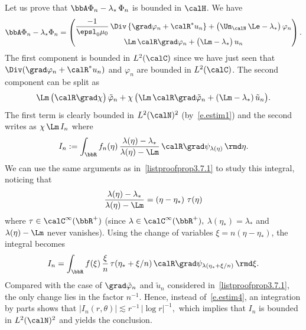 \begin{proofc}
\begin{step}\label{listproofprop3.7.3}
Let us prove that $\bbA \Phi_n - \lambda_*\,\Phi_n$ is bounded in $\calH$. We have
\[
\bbA \Phi_n - \lambda_* \Phi_n =
\begin{pmatrix}
\displaystyle \frac{-1}{\epsl_0 \mu_0}\,\Div \left\{ \grad\varphi_n + \calR^* u_n \right\} + \big(\Un_\calN\,\Le - \lambda_* \big)\,\varphi_n \\[8pt]
\Lm\,\calR\grad\varphi_n + \big(\Lm - \lambda_* \big)\,u_n
\end{pmatrix}.
\]
The first component is bounded in $L^2(\calC)$ since we have just seen that $\Div (\grad \varphi_n + \calR^* u_n) $ and $\varphi_n$ are bounded in $L^2(\calC)$. The second component can be split as
\[
\Lm\,\big(\calR\grad\chi\big)\,\tilde\varphi_n + \chi\,\big(\Lm\,\calR\grad\tilde\varphi_n +(\Lm - \lambda_*)\,\tilde u_n\big).
\]
The first term is clearly bounded in $L^2(\calN)^2$ (by~\eqref{e.estim1}) and the second writes as $\chi\,\Lm\,I_n$ where
\[
I_n := \int_\bbR f_n(\eta)\, \frac{\lambda(\eta)-\lambda_*}{\lambda(\eta)-\Lm}\,\calR \grad\psi_{\lambda(\eta)} \,\rmd\eta.
\]
We can use the same arguments as in~\eqref{listproofprop3.7.1} to study this integral, noticing that
\[
\frac{\lambda(\eta)-\lambda_*}{\lambda(\eta)-\Lm} = (\eta - \eta_*)\ \tau(\eta)
\]
where $\tau \in \calC^\infty(\bbR^+)$ (since $\lambda \in \calC^\infty(\bbR^+),$ $\lambda(\eta_*) = \lambda_*$ and $\lambda(\eta)-\Lm$ never vanishes). Using the change of variables $\xi = n(\eta - \eta_*)$, the integral becomes
\[
I_n = \int_{\bbR} f(\xi)\, \frac{\xi}{n}\, \tau(\eta_* + \xi/n)\,\calR \grad\psi_{\lambda(\eta_* + \xi/n)}\, \rmd \xi.
\]
Compared with the case of $\grad\tilde\varphi_n$ and $\tilde u_n$ considered in~\eqref{listproofprop3.7.1}, the only change lies in the factor $n^{-1}$. Hence, instead of~\eqref{e.estim4}, an integration by parts shows that $|I_n(r,\theta)| \lesssim r^{-1}\,|\log r|^{-1},$ which implies that $I_n$ is bounded in $L^2(\calN)^2$ and yields the conclusion.
\end{step}


\end{proofc}
